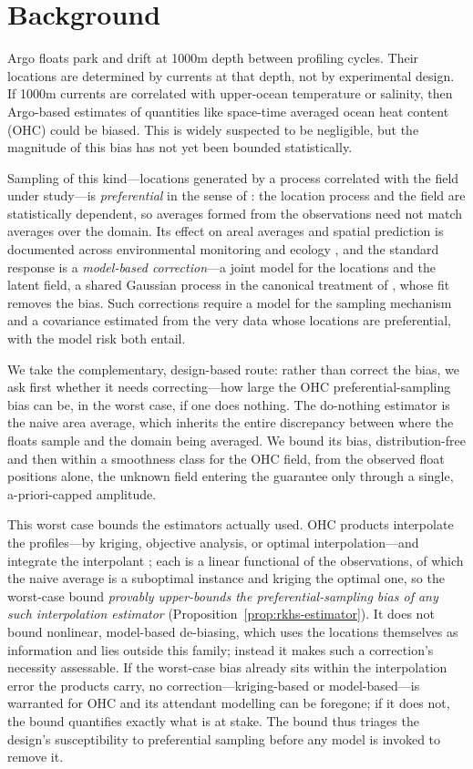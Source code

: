 \section{Background}
\label{sec:background}

Argo floats park and drift at 1000m depth between profiling cycles.
Their locations are determined by currents at that depth, not by experimental design.
If 1000m currents are correlated with upper-ocean temperature or salinity, then Argo-based estimates of quantities like space-time averaged ocean heat content (OHC) could be biased.
This is widely suspected to be negligible, but the magnitude of this bias has not yet been bounded statistically.

Sampling of this kind---locations generated by a process correlated with the
field under study---is \emph{preferential} in the sense of \citet{diggle2010}:
the location process and the field are statistically dependent, so averages
formed from the observations need not match averages over the domain. Its effect
on areal averages and spatial prediction is documented across environmental
monitoring and ecology \citep{gelfand2012,zidek2014,conn2017,dumelle2022}, and
the standard response is a \emph{model-based correction}---a joint model for the
locations and the latent field, a shared Gaussian process in the canonical
treatment of \citet{diggle2010}, whose fit removes the bias. Such corrections
require a model for the sampling mechanism and a covariance estimated from the
very data whose locations are preferential, with the model risk both entail.

We take the complementary, design-based route: rather than correct the bias, we
ask first whether it needs correcting---how large the OHC preferential-sampling
bias can be, in the worst case, if one does nothing. The do-nothing estimator is
the naive area average, which inherits the entire discrepancy between where the
floats sample and the domain being averaged. We bound its bias, distribution-free
and then within a smoothness class for the OHC field, from the observed float
positions alone, the unknown field entering the guarantee only through a single,
a-priori-capped amplitude.

This worst case bounds the estimators actually used. OHC products interpolate the
profiles---by kriging, objective analysis, or optimal interpolation---and
integrate the interpolant \citep{baugh2022}; each is a linear functional of the
observations, of which the naive average is a suboptimal instance and kriging the
optimal one, so the worst-case bound \emph{provably upper-bounds the
preferential-sampling bias of any such interpolation estimator}
(Proposition~\ref{prop:rkhs-estimator}). It does not bound nonlinear, model-based
de-biasing, which uses the locations themselves as information and lies outside
this family; instead it makes such a correction's necessity assessable. If the
worst-case bias already sits within the interpolation error the products carry,
no correction---kriging-based or model-based---is warranted for OHC and its
attendant modelling can be foregone; if it does not, the bound quantifies exactly
what is at stake. The bound thus triages the design's susceptibility to
preferential sampling before any model is invoked to remove it.


